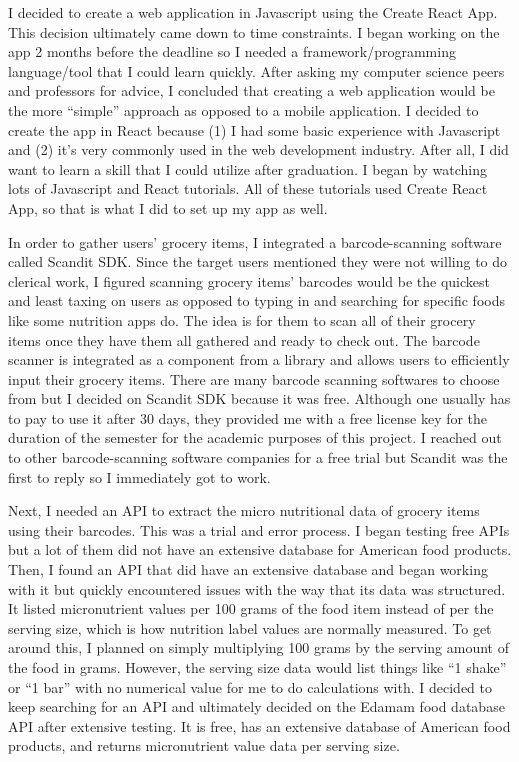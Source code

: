\documentclass[10pt,twocolumn]{article}
\begin{document}
I decided to create a web application in Javascript using the Create React App. This decision ultimately came down to time constraints. I began working on the app 2 months before the deadline so I needed a framework/programming language/tool that I could learn quickly. After asking my computer science peers and professors for advice, I concluded that creating a web application would be the more “simple” approach as opposed to a mobile application. I decided to create the app in React because (1) I had some basic experience with Javascript and (2) it’s very commonly used in the web development industry. After all, I did want to learn a skill that I could utilize after graduation. I began by watching lots of Javascript and React tutorials. All of these tutorials used Create React App, so that is what I did to set up my app as well. 

In order to gather users’ grocery items, I integrated a barcode-scanning software called Scandit SDK.\cite{Scandit_SDK} Since the target users mentioned they were not willing to do clerical work, I figured scanning grocery items’ barcodes would be the quickest and least taxing on users as opposed to typing in and searching for specific foods like some nutrition apps do. The idea is for them to scan all of their grocery items once they have them all gathered and ready to check out. The barcode scanner is integrated as a component from a library and allows users to efficiently input their grocery items. There are many barcode scanning softwares to choose from but I decided on Scandit SDK because it was free. Although one usually has to pay to use it after 30 days, they provided me with a free license key for the duration of the semester for the academic purposes of this project. I reached out to other barcode-scanning software companies for a free trial but Scandit was the first to reply so I immediately got to work. 

Next, I needed an API to extract the micro nutritional data of grocery items using their barcodes. This was a trial and error process. I began testing free APIs but a lot of them did not have an extensive database for American food products. Then, I found an API that did have an extensive database and began working with it but quickly encountered issues with the way that its data was structured. It listed micronutrient values per 100 grams of the food item instead of per the serving size, which is how nutrition label values are normally measured. To get around this, I planned on simply multiplying 100 grams by the serving amount of the food in grams. However, the serving size data would list things like “1 shake” or “1 bar” with no numerical value for me to do calculations with. I decided to keep searching for an API and ultimately decided on the Edamam food database API after extensive testing.\cite{edamam_doc} It is free, has an extensive database of American food products, and returns micronutrient value data per serving size. 
\end{document}
